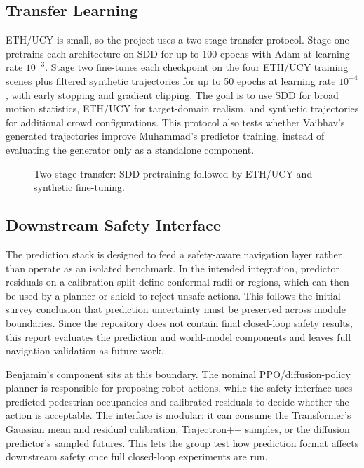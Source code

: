 \documentclass[conference]{IEEEtran}
\begin{document}
\subsection{Transfer Learning}
\label{sec:transfer}

ETH/UCY is small, so the project uses a two-stage transfer protocol. Stage one pretrains
each architecture on SDD for up to 100 epochs with Adam at learning rate
$10^{-3}$. Stage two fine-tunes each checkpoint on the four ETH/UCY training
scenes plus filtered synthetic trajectories for up to 50 epochs at learning
rate $10^{-4}$, with early stopping and gradient clipping. The goal is to use
SDD for broad motion statistics, ETH/UCY for target-domain realism, and
synthetic trajectories for additional crowd configurations. This protocol also
tests whether Vaibhav's generated trajectories improve Muhammad's predictor
training, instead of evaluating the generator only as a standalone component.

\begin{figure}[t]
  \centering
  \resizebox{0.62\columnwidth}{!}{}
  \caption{Two-stage transfer: SDD pretraining followed by ETH/UCY and synthetic
  fine-tuning.}
  \label{fig:finetune}
\end{figure}

\subsection{Downstream Safety Interface}

The prediction stack is designed to feed a safety-aware navigation layer rather
than operate as an isolated benchmark. In the intended integration, predictor
residuals on a calibration split define conformal radii or regions, which can
then be used by a planner or shield to reject unsafe actions. This follows the
initial survey conclusion that prediction uncertainty must be preserved across module
boundaries. Since the repository does not contain final closed-loop safety
results, this report evaluates the prediction and world-model components and
leaves full navigation validation as future work.

Benjamin's component sits at this boundary. The nominal PPO/diffusion-policy
planner is responsible for proposing robot actions, while the safety interface
uses predicted pedestrian occupancies and calibrated residuals to decide whether
the action is acceptable. The interface is modular: it can consume
the Transformer's Gaussian mean and residual calibration, Trajectron++ samples,
or the diffusion predictor's sampled futures. This lets the group test how
prediction format affects downstream safety once full closed-loop experiments
are run.
\end{document}

